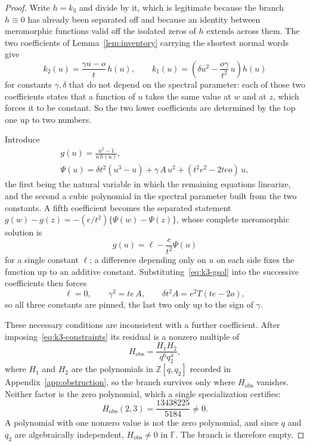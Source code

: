 \documentclass[
  aps,pre,
  reprint,
  superscriptaddress,
  amsmath,amssymb,
  floatfix
]{revtex4-2}
\theoremstyle{plain}
\theoremstyle{definition}
\theoremstyle{remark}
\newcommand{\Fld}{\mathbb{F}}
\begin{document}
\begin{proof}
Write $h=k_3$ and divide by it, which is legitimate because the branch
$h\equiv0$ has already been separated off and because an identity between
meromorphic functions valid off the isolated zeros of $h$ extends across them.
The two coefficients of Lemma~\ref{lem:inventory} carrying the shortest normal
words give
\begin{equation}
  k_2(u)=\frac{\gamma u-o}{t}\,h(u),\qquad
  k_1(u)=\left(\delta u^2-\frac{o\gamma}{t^2}\,u\right)h(u)
  \label{eq:k3-reduction}
\end{equation}
for constants $\gamma,\delta$ that do not depend on the spectral parameter:
each of those two coefficients states that a function of $u$ takes the same
value at $w$ and at $z$, which forces it to be constant. So the two lower
coefficients are determined by the top one up to two numbers.

Introduce
\begin{equation}
  \begin{gathered}
  g(u)=\frac{u^2-1}{u\,h(u)},\\
  \Psi(u)=\delta t^2(u^3-u)+\gamma\,A\,u^2+(t^2e^2-2teo)\,u ,
  \end{gathered}
  \label{eq:k3-g}
\end{equation}
the first being the natural variable in which the remaining equations
linearize, and the second a cubic polynomial in the spectral parameter built
from the two constants. A fifth coefficient becomes the separated statement
$g(w)-g(z)=-(e/t^2)\{\Psi(w)-\Psi(z)\}$, whose complete meromorphic solution is
\begin{equation}
  g(u)=\ell-\frac{e}{t^2}\Psi(u)
  \label{eq:k3-gsol}
\end{equation}
for a single constant $\ell$; a difference depending only on $u$ on each side
fixes the function up to an additive constant. Substituting~\eqref{eq:k3-gsol}
into the successive coefficients then forces
\begin{equation}
  \ell=0,\qquad \gamma^2=te\,A,\qquad \delta t^2A=e^2T(te-2o),
  \label{eq:k3-constraints}
\end{equation}
so all three constants are pinned, the last two only up to the sign of
$\gamma$.

These necessary conditions are inconsistent with a further coefficient. After
imposing~\eqref{eq:k3-constraints} its residual is a nonzero multiple of
\begin{equation}
  H_{\mathrm{obs}}=\frac{H_1H_2}{q^6q_2^4} ,
  \label{eq:hobs}
\end{equation}
where $H_1$ and $H_2$ are the polynomials in $\mathbb{Z}[q,q_2]$ recorded in
Appendix~\ref{app:obstruction}, so the branch survives only where
$H_{\mathrm{obs}}$ vanishes. Neither factor is the zero polynomial, which a
single specialization certifies:
\begin{equation}
  H_{\mathrm{obs}}(2,3)=\frac{13438225}{5184}\ne0 .
  \label{eq:hobs-value}
\end{equation}
A polynomial with one nonzero value is not the zero polynomial, and since $q$
and $q_2$ are algebraically independent, $H_{\mathrm{obs}}\neq0$ in $\Fld$.
The branch is therefore empty.
\end{proof}
\end{document}

